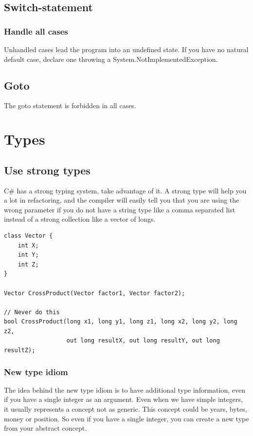 \documentclass[11pt,a4paper]{article}
\begin{document}
\subsection{Switch-statement}

\subsubsection{Handle all cases}

Unhandled cases lead the program into an undefined state. If you have no natural default case, declare one throwing a System.NotImplementedException.

\subsection{Goto}

The goto statement is forbidden in all cases.

\section{Types}

\subsection{Use strong types}

C\# has a strong typing system, take advantage of it. A strong type will help you a lot in refactoring, and the compiler will easily tell you that you are using the wrong parameter if you do not have a string type like a comma separated list instead of a strong collection like a vector of longs.

\begin{lstlisting}[language={[Sharp]C}, caption={Create a strong type}]
class Vector {
    int X;
    int Y;
    int Z;
}

Vector CrossProduct(Vector factor1, Vector factor2);

// Never do this
bool CrossProduct(long x1, long y1, long z1, long x2, long y2, long z2,
                  out long resultX, out long resultY, out long resultZ);
\end{lstlisting}

\subsubsection{New type idiom}
The idea behind the new type idiom is to have additional type information, even if you have a single integer as an argument. Even when we have simple integers, it usually represents a concept not as generic. This concept could be years, bytes, money or position. 
 So even if you have a single integer, you can create a new type from your abstract concept.
\end{document}
